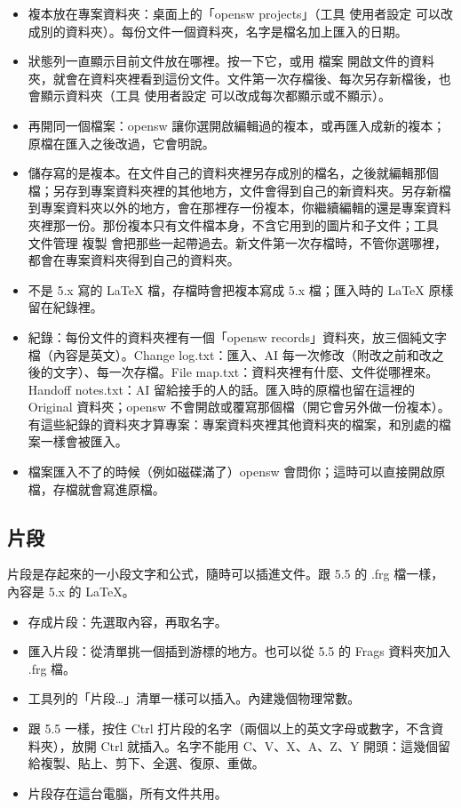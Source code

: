 \begin{itemize}
\item 複本放在專案資料夾：桌面上的「opensw projects」（工具 \TEXTsymbol{>} 使用者設定 可以改成別的資料夾）。每份文件一個資料夾，名字是檔名加上匯入的日期。
\item 狀態列一直顯示目前文件放在哪裡。按一下它，或用 檔案 \TEXTsymbol{>} 開啟文件的資料夾，就會在資料夾裡看到這份文件。文件第一次存檔後、每次另存新檔後，也會顯示資料夾（工具 \TEXTsymbol{>} 使用者設定 可以改成每次都顯示或不顯示）。
\item 再開同一個檔案：opensw 讓你選開啟編輯過的複本，或再匯入成新的複本；原檔在匯入之後改過，它會明說。
\item 儲存寫的是複本。在文件自己的資料夾裡另存成別的檔名，之後就編輯那個檔；另存到專案資料夾裡的其他地方，文件會得到自己的新資料夾。另存新檔到專案資料夾以外的地方，會在那裡存一份複本，你繼續編輯的還是專案資料夾裡那一份。那份複本只有文件檔本身，不含它用到的圖片和子文件；工具 \TEXTsymbol{>} 文件管理 \TEXTsymbol{>} 複製 會把那些一起帶過去。新文件第一次存檔時，不管你選哪裡，都會在專案資料夾得到自己的資料夾。
\item 不是 5.x 寫的 LaTeX 檔，存檔時會把複本寫成 5.x 檔；匯入時的 LaTeX 原樣留在紀錄裡。
\item 紀錄：每份文件的資料夾裡有一個「opensw records」資料夾，放三個純文字檔（內容是英文）。Change log.txt：匯入、AI 每一次修改（附改之前和改之後的文字）、每一次存檔。File map.txt：資料夾裡有什麼、文件從哪裡來。Handoff notes.txt：AI 留給接手的人的話。匯入時的原檔也留在這裡的 Original 資料夾；opensw 不會開啟或覆寫那個檔（開它會另外做一份複本）。有這些紀錄的資料夾才算專案：專案資料夾裡其他資料夾的檔案，和別處的檔案一樣會被匯入。
\item 檔案匯入不了的時候（例如磁碟滿了）opensw 會問你；這時可以直接開啟原檔，存檔就會寫進原檔。
\end{itemize}

\subsection{片段}

片段是存起來的一小段文字和公式，隨時可以插進文件。跟 5.5 的 .frg 檔一樣，內容是 5.x 的 LaTeX。

\begin{itemize}
\item 存成片段：先選取內容，再取名字。
\item 匯入片段：從清單挑一個插到游標的地方。也可以從 5.5 的 Frags 資料夾加入 .frg 檔。
\item 工具列的「片段…」清單一樣可以插入。內建幾個物理常數。
\item 跟 5.5 一樣，按住 Ctrl 打片段的名字（兩個以上的英文字母或數字，不含資料夾），放開 Ctrl 就插入。名字不能用 C、V、X、A、Z、Y 開頭：這幾個留給複製、貼上、剪下、全選、復原、重做。
\item 片段存在這台電腦，所有文件共用。
\end{itemize}

